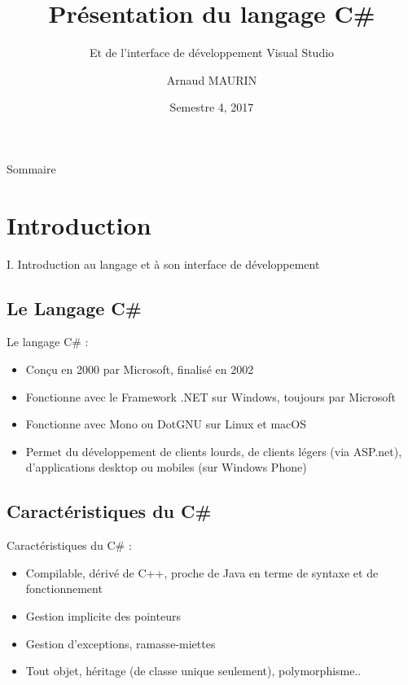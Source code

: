 \documentclass{beamer}
\title{Présentation du langage C\#}
\subtitle{Et de l'interface de développement Visual Studio}
\author{Arnaud MAURIN}
\institute[Université de Montpellier] 
{
  Licence 2 informatique\\
  HLIN408 - TCCP
}
\date{Semestre 4, 2017}
\begin{document}
\begin{frame}
  \titlepage
\end{frame}

\begin{frame}{Sommaire}
  \tableofcontents
\end{frame}

\section{Introduction}

    \begin{frame}{}
    \LARGE I. Introduction au langage et à son interface de développement
    \end{frame}

\subsection{Le Langage C\#}

\begin{frame}{Le langage C\# :}
  \begin{itemize}
  \item {
    Conçu en 2000 par Microsoft, finalisé en 2002
    \pause
  }
  \item {   
    Fonctionne avec le Framework .NET sur Windows, toujours par Microsoft
    \pause
  }
  \item {
    Fonctionne avec Mono ou DotGNU sur Linux et macOS
    \pause
  }
  \item {
    Permet du développement de clients lourds, de clients légers (via ASP.net), d'applications desktop ou mobiles (sur Windows Phone)
  }
  \end{itemize}
\end{frame}

\subsection{Caractéristiques du C\#}

\begin{frame}{Caractéristiques du C\# :}
  \begin{itemize}
  \item {
    Compilable, dérivé de C++, proche de Java en terme de syntaxe et de fonctionnement
    \pause
  }
  \item {   
    Gestion implicite des pointeurs
    \pause
  }
  \item {
    Gestion d'exceptions, ramasse-miettes
    \pause
  }
  \item {
    Tout objet, héritage (de classe unique seulement), polymorphisme..
  }
  \end{itemize}
\end{frame}
\end{document}
